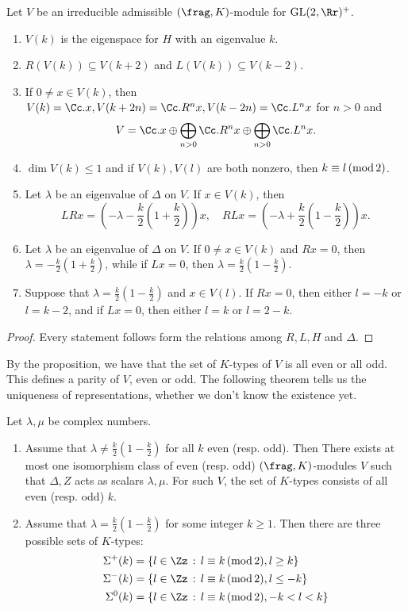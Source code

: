 \begin{proposition}
Let $V$ be an irreducible admissible $(\frag, K)$-module for $\GL(2, \Rr)^{+}$. 
\begin{enumerate}
\item $V(k)$ is the eigenspace for $H$ with an eigenvalue $k$. 
\item $R(V(k)) \subseteq V(k+2)$ and $L(V(k))\subseteq V(k-2)$. 
\item If $0\neq x\in V(k)$, then $V(k) = \Cc. x, V(k+2n) = \Cc. R^{n}x, V(k-2n) =\Cc. L^{n}x$ for $n>0$ and 
$$
V = \Cc. x \oplus \bigoplus _{n>0} \Cc. R^{n}x \oplus \bigoplus_{n>0} \Cc. L^{n}x.
$$
\item $\dim V(k) \leq 1$ and if $V(k), V(l)$ are both nonzero, then $k\equiv l\,(\mathrm{mod}\,2)$. 
\item Let $\lambda$ be an eigenvalue of $\Delta$ on $V$. If $x\in V(k)$, then 
$$
LRx=\left( -\lambda - \frac{k}{2}\left(1 + \frac{k}{2}\right)\right) x, \quad RLx = \left( - \lambda + \frac{k}{2}\left( 1- \frac{k}{2}\right)\right)x.
$$
\item Let $\lambda$ be an eigenvalue of $\Delta$ on $V$. If $0\neq x\in V(k)$ and $Rx = 0$, then $\lambda = -\frac{k}{2}\left( 1 +\frac{k}{2}\right)$, while if $Lx = 0$, then $\lambda = \frac{k}{2}\left(1-\frac{k}{2}\right)$. 
\item Suppose that $\lambda = \frac{k}{2}\left( 1-\frac{k}{2}\right)$ and $x\in V(l)$. If $Rx =0$, then either $l =-k$ or $l = k-2$, and if $Lx = 0$, then either $l = k$ or $l = 2-k$. 
\end{enumerate}
\end{proposition}
\begin{proof}
Every statement follows form the relations among $R, L, H$ and $\Delta$. 
\end{proof}
By the proposition, we have that the set of $K$-types of $V$ is all even or all odd. This defines a parity of $V$, even or odd. 
The following theorem tells us the uniqueness of representations, whether we don't know the existence yet. 
\begin{theorem}
Let $\lambda, \mu$ be complex numbers. 
\begin{enumerate}
\item Assume that $\lambda \neq \frac{k}{2}\left( 1-\frac{k}{2}\right)$ for all $k$ even (resp. odd). Then There exists at most one isomorphism class of even (resp. odd) $(\frag, K)$-modules $V$ such that $\Delta, Z$ acts as scalars $\lambda, \mu$. For such $V$, the set of $K$-types consists of all even (resp. odd) $k$. 
\item Assume that $\lambda = \frac{k}{2}\left(1-\frac{k}{2}\right)$ for some integer $k\geq 1$. Then there are three possible sets of $K$-types:
\begin{align*}
\Sigma^{+}(k) &= \{l\in \Zz\,:\, l\equiv k\Mod{2}, l\geq k\} \\
\Sigma^{-}(k) &= \{l\in \Zz\,:\, l\equiv k\Mod{2}, l\leq -k\} \\
\Sigma^{0}(k) &= \{l\in \Zz\,:\, l\equiv k\Mod{2}, -k < l < k\}
\end{align*}
\end{enumerate}
\end{theorem}
